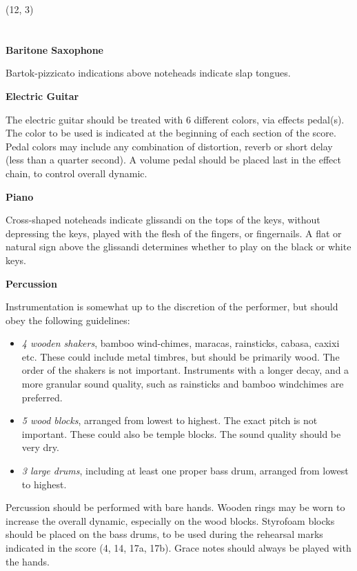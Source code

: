 \documentclass{article}
\begin{document}
\begin{textblock}{11}(12, 3)

\section{}

    \textbf{Baritone Saxophone}

    Bartok-pizzicato indications above noteheads indicate slap tongues.

    \textbf{Electric Guitar}

    The electric guitar should be treated with 6 different colors, via effects
    pedal(s). The color to be used is indicated at the beginning of each
    section of the score.  Pedal colors may include any combination of
    distortion, reverb or short delay (less than a quarter second).  A volume
    pedal should be placed last in the effect chain, to control overall
    dynamic.

    \textbf{Piano}

    Cross-shaped noteheads indicate glissandi on the tops of the keys, without
    depressing the keys, played with the flesh of the fingers, or fingernails.
    A flat or natural sign above the glissandi determines whether to play on
    the black or white keys.

    \textbf{Percussion}

    Instrumentation is somewhat up to the discretion of the performer, but
    should obey the following guidelines:

    \vspace{-\topsep}
    \begin{itemize}
        \item \emph{4 wooden shakers}, bamboo wind-chimes, maracas, rainsticks,
        cabasa, caxixi etc. These could include metal timbres, but should be
        primarily wood. The order of the shakers is not important.  Instruments
        with a longer decay, and a more granular sound quality, such as
        rainsticks and bamboo windchimes are preferred.
        \item \emph{5 wood blocks}, arranged from lowest to highest.  The
        exact pitch is not important. These could also be temple blocks. The
        sound quality should be very dry.
        \item \emph{3 large drums}, including at least one proper bass drum,
        arranged from lowest to highest.
    \end{itemize}
    \vspace{-\topsep}

    Percussion should be performed with bare hands. Wooden rings may be worn to
    increase the overall dynamic, especially on the wood blocks. Styrofoam
    blocks should be placed on the bass drums, to be used during the rehearsal
    marks indicated in the score (4, 14, 17a, 17b). Grace notes should always
    be played with the hands.

\end{textblock}
\end{document}

